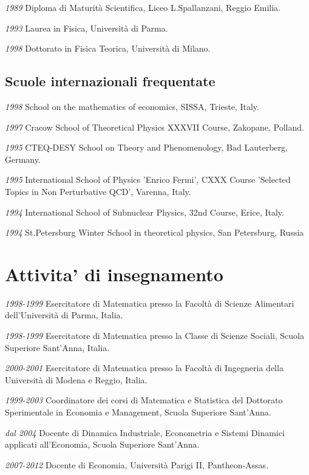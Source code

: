 \documentclass[a4paper]{article}
\begin{document}
\emph{1989} Diploma di Maturità Scientifica, Liceo L.Spallanzani, Reggio
Emilia.

\emph{1993} Laurea in Fisica, Università di Parma.

\emph{1998} Dottorato in Fisica Teorica, Università di Milano.


\subsection{Scuole internazionali frequentate%
  \label{scuole-internazionali-frequentate}%
}

\emph{1998} School on the mathematics of economics, SISSA, Trieste, Italy.

\emph{1997} Cracow School of Theoretical Physics XXXVII Course, Zakopane,
Polland.

\emph{1995} CTEQ-DESY School on Theory and Phenomenology, Bad Lauterberg,
Germany.

\emph{1995} International School of Physics 'Enrico Fermi', CXXX Course
'Selected Topics in Non Perturbative QCD', Varenna, Italy.

\emph{1994} International School of Subnuclear Physics, 32nd Course, Erice,
Italy.

\emph{1994} St.Petersburg Winter School in theoretical physics, San
Petersburg, Russia


\section{Attivita' di insegnamento%
  \label{attivita-di-insegnamento}%
}

\emph{1998-1999} Esercitatore di Matematica presso la Facoltà di Scienze
Alimentari dell'Università di Parma, Italia.

\emph{1998-1999} Esercitatore di Matematica presso la Classe di Scienze
Sociali, Scuola Superiore Sant'Anna, Italia.

\emph{2000-2001} Esercitatore di Matematica presso la Facoltà di Ingegneria
della Università di Modena e Reggio, Italia.

\emph{1999-2003} Coordinatore dei corsi di Matematica e Statistica del
Dottorato Sperimentale in Economia e Management, Scuola Superiore
Sant'Anna.

\emph{dal 2004} Docente di Dinamica Industriale, Econometria e Sistemi
Dinamici applicati all'Economia, Scuola Superiore Sant'Anna.

\emph{2007-2012} Docente di Economia, Università Parigi II, Pantheon-Assas.
\end{document}
